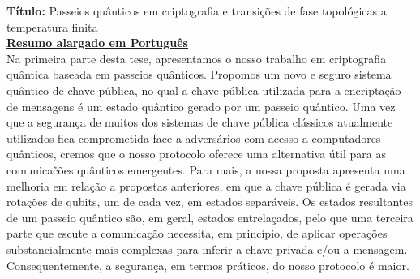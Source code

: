 \documentclass[11pt]{report}
\begin{document}
\noindent\textbf{T\'itulo:} Passeios qu\^{a}nticos em criptografia e transi\c{c}\~{o}es de fase topol\'{o}gicas a temperatura finita\\

\noindent\underline{\textbf{Resumo alargado em Portugu\^{e}s}}\\
Na primeira parte desta tese, apresentamos o nosso trabalho em criptografia qu\^{a}ntica baseada em passeios  qu\^{a}nticos. Propomos um novo e seguro sistema qu\^{a}ntico de chave p\'{u}blica, no qual a chave p\'{u}blica utilizada para a encripta\c{c}\~{a}o de mensagens \'{e} um estado qu\^{a}ntico gerado por um passeio qu\^{a}ntico. Uma vez que a seguran\c{c}a de muitos dos sistemas de chave p\'{u}blica cl\'{a}ssicos atualmente utilizados fica comprometida face a advers\'{a}rios com acesso a computadores qu\^{a}nticos, cremos que o nosso protocolo oferece uma alternativa \'{u}til para as comunica\~{c}\~{o}es qu\^{a}nticos emergentes. Para mais, a nossa proposta apresenta uma melhoria em rela\c{c}\~{a}o a propostas anteriores, em que a chave p\'{u}blica \'{e} gerada via rota\c{c}\~{o}es de qubits, um de cada vez, em estados separ\'{a}veis. Os estados resultantes de um passeio qu\^{a}ntico s\~{a}o, em geral, estados entrela\c{c}ados, pelo que uma terceira parte que escute a comunica\c{c}\~{a}o necessita, em princ\'{i}pio, de aplicar opera\c{c}\~{o}es substancialmente mais complexas para inferir a chave privada e/ou a mensagem. Consequentemente, a seguran\c{c}a, em termos pr\'{a}ticos, do nosso protocolo \'{e} maior.
\end{document}
